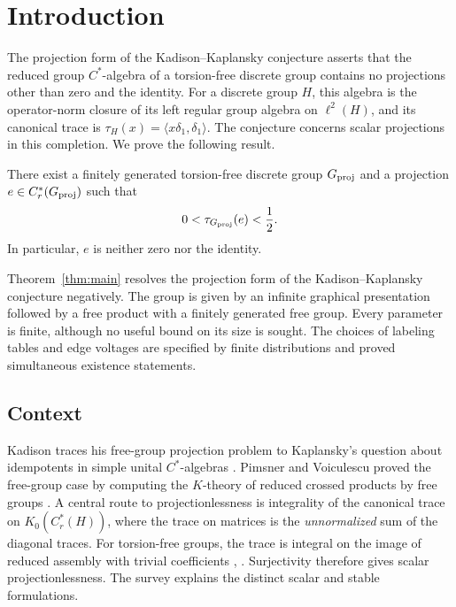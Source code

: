 \section{Introduction}
\label{sec:introduction}

The projection form of the Kadison--Kaplansky conjecture asserts that
the reduced group \(C^*\)-algebra of a torsion-free discrete group
contains no projections other than zero and the identity.
For a discrete group \(H\), this algebra is the operator-norm closure
of its left regular group algebra on \(\ell^2(H)\), and its canonical
trace is \(\tau_H(x)=\langle x\delta_1,\delta_1\rangle\).
The conjecture concerns scalar projections in this completion.
We prove the following result.

\begin{theorem}
\label{thm:main}
There exist a finitely generated torsion-free discrete group \(G_{\mathrm{proj}}\)
and a projection \(e\in C_r^*(G_{\mathrm{proj}})\) such that
\[
 0<\tau_{G_{\mathrm{proj}}}(e)<\frac12.
\]
In particular, \(e\) is neither zero nor the identity.
\end{theorem}

Theorem~\ref{thm:main} resolves the projection form of the
Kadison--Kaplansky conjecture negatively.
The group is given by an infinite graphical presentation followed
by a free product with a finitely generated free group.
Every parameter is finite, although no useful bound on its size
is sought. The choices of labeling tables and edge voltages are
specified by finite distributions and proved simultaneous
existence statements.

\subsection*{Context}

Kadison traces his free-group projection problem to Kaplansky's question
about idempotents in simple unital \(C^*\)-algebras
\cite[pp.~222--224]{Kadison2008}.
Pimsner and Voiculescu proved the free-group case by computing the
\(K\)-theory of reduced crossed products by free groups
\cite[p.~131]{PimsnerVoiculescu1982}.
A central route to projectionlessness is integrality of the canonical
trace on \(K_0(C_r^*(H))\), where the trace on matrices is the
\emph{unnormalized} sum of the diagonal traces. For torsion-free groups,
the trace is integral on the image of reduced assembly with trivial
coefficients \cite[Theorem~0.3]{Luck2002},
\cite[Proposition~10.3]{BGW2016}. Surjectivity therefore gives scalar
projectionlessness. The survey \cite[Section~4.5.3]{GJV2019} explains the
distinct scalar and stable formulations.


